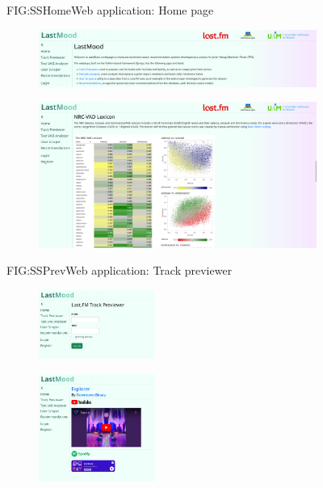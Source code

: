 \begin{figure}[Web application: Home page]{FIG:SSHome}{Web application: Home page}
    \begin{subfigure}[SBFIG:SSHome1]{Tools introduction}{\includegraphics[width=1\textwidth]{img/SSHome1.png}}
    \end{subfigure}
    \begin{subfigure}[SBFIG:SSHome2]{Interactive \acs{nrc}-\acs{vad} lexicon embed}{\includegraphics[width=1\textwidth]{img/SSHome2.png}}
    \end{subfigure}
\end{figure}

\begin{figure}[Web application: Track previewer]{FIG:SSPrev}{Web application: Track previewer}
    \begin{subfigure}[SBFIG:SSPrevForm]{Track previewer form}{\includegraphics[width=0.42\textwidth]{img/SSPrevForm.png}}
    \end{subfigure}
    \begin{subfigure}[SBFIG:SSPrev]{Example preview with artist \emph{Downtown Binary} and title \emph{Explorer}}{\includegraphics[width=0.42\textwidth]{img/SSPrev.png}}
    \end{subfigure}
\end{figure}

